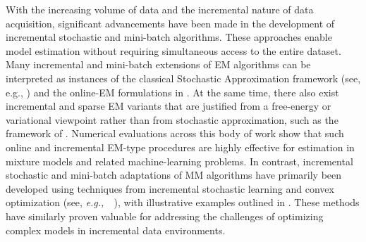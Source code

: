 \documentclass{article}
\def\eg{{\em e.g.,~}}
\begin{document}
With the increasing volume of data and the incremental nature of data acquisition, significant advancements have been made in the development of incremental stochastic and mini-batch algorithms. These approaches enable model estimation without requiring simultaneous access to the entire dataset.
Many incremental and mini-batch extensions of EM algorithms can be interpreted as instances of the classical Stochastic Approximation framework (see, e.g., \cite{borkar_stochastic_2008,kushner_stochastic_2003,dieuleveut_stochastic_2023,fort_stochastic_2023,wang_spiderboost_2019}) and the online-EM formulations in \cite{cappe_Online_2009,cappe_online_2011,fort_fast_2021,fort_stochastic_2020,nguyen_mini_batch_2020,kuhn_properties_2020,karimi_global_2019,corff_online_2013,karimi_non_asymptotic_2019,oudoumanessah2024,oudoumanessah2025,chen_stochastic_2018,fort_geom_spider_em_2021,fort_perturbed_2021}. At the same time, there also exist incremental and sparse EM variants that are justified from a free-energy or variational viewpoint rather than from stochastic approximation, such as the framework of \cite{neal_view_1998}. Numerical evaluations across this body of work show that such online and incremental EM-type procedures are highly effective for estimation in mixture models and related machine-learning problems.
In contrast, incremental stochastic and mini-batch adaptations of MM algorithms have primarily been developed using techniques from incremental stochastic learning and convex optimization (see, \eg~\cite{chouzenoux2022sabrina,hazan_introduction_2016,jiang2024stochastic,lan_first_order_2020,lupu2024convergence,razaviyayn_stochastic_2016,shalev_shwartz_online_2012}), with illustrative examples outlined in \cite{mairal_incremental_2015,mensch_stochastic_2018,nguyen_online_2023,chouzenoux_stochastic_2017,lyu2024stochastic,lyu_online_2022,le_thi_online_2024,le_thi_online_2020,le_thi_dca_2021,fort_sequential_2024,dieuleveut_federated_2025}. These methods have similarly proven valuable for addressing the challenges of optimizing complex models in incremental data environments.
\end{document}
